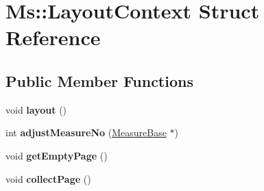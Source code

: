 \hypertarget{struct_ms_1_1_layout_context}{}\section{Ms\+:\+:Layout\+Context Struct Reference}
\label{struct_ms_1_1_layout_context}
\subsection*{Public Member Functions}
\begin{DoxyCompactItemize}
\item 
\mbox{\label{struct_ms_1_1_layout_context_a8343c23d70b61fe4572e2adef6330667}} 
void {\bfseries layout} ()
\item 
\mbox{\label{struct_ms_1_1_layout_context_ae0e98f18c6aade818eb0c8594cebc69c}} 
int {\bfseries adjust\+Measure\+No} (\hyperlink{class_ms_1_1_measure_base}{Measure\+Base} $\ast$)
\item 
\mbox{\label{struct_ms_1_1_layout_context_aaa4822d205d90fc6665cfab3b1bcaa4b}} 
void {\bfseries get\+Empty\+Page} ()
\item 
\mbox{\label{struct_ms_1_1_layout_context_a930ae8dc2a6af49471c7d2a8860d7411}} 
void {\bfseries collect\+Page} ()
\end{DoxyCompactItemize}
